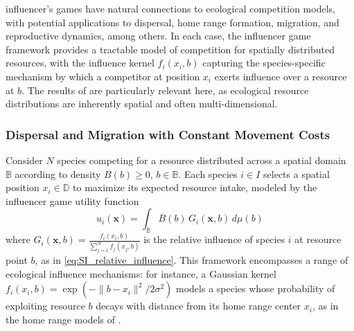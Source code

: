 \documentclass{article}
\begin{document}
            influencer's games have natural connections to ecological competition models, with potential applications to dispersal, home range formation, migration, and reproductive dynamics, among others.
            In each case, the influencer game framework provides a tractable model of competition for spatially distributed resources, with the influence kernel $f_i(x_i,b)$ capturing the species-specific mechanism by which a competitor at position $x_i$ exerts influence over a resource at $b$.
            The results of  are particularly relevant here, as ecological resource distributions are inherently spatial and often multi-dimensional.

        \subsubsection{Dispersal and Migration with Constant Movement Costs}\label{subsubsec:SI_ecology_dispersal}

            Consider $N$ species competing for a resource distributed across a spatial domain $\mathbb{B}$ according to density $B(b) \geq 0$, $b \in \mathbb{B}$.
            Each species $i \in I$ selects a spatial position $x_i \in \mathbb{D}$ to maximize its expected resource intake, modeled by the influencer game utility function
            \begin{equation}
                \label{eq:SI_ecology_utility}
                u_i(\mathbf{x}) = \int_{\mathbb{B}} B(b)\,G_i(\mathbf{x},b)\,d\mu(b)
            \end{equation}
            where $G_i(\mathbf{x},b) = \frac{f_i(x_i,b)}{\sum_{j=1}^N f_j(x_j,b)}$ is the relative influence of species $i$ at resource point $b$, as in \cref{eq:SI_relative_influence}.
            This framework encompasses a range of ecological influence mechanisms: for instance, a Gaussian kernel $f_i(x_i,b) = \exp(-\|b - x_i\|^2 / 2\sigma^2)$ models a species whose probability of exploiting resource $b$ decays with distance from its home range center $x_i$, as in the home range models of \cite{borger2008effects}.
\end{document}
